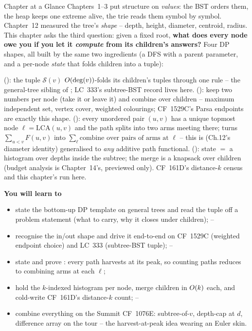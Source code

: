 \begin{chaptertheorybox}{Chapter at a Glance}
Chapters~1--3 put structure on \emph{values}: the BST orders them, the heap
keeps one extreme alive, the trie reads them symbol by symbol. Chapter~12
measured the tree's \emph{shape} -- depth, height, diameter, centroid, radius.
This chapter asks the third question: given a fixed root, \textbf{what does
every node owe you if you let it \emph{compute} from its children's answers?}
Four DP shapes, all built by the same two ingredients (a DFS with a parent
parameter, and a per-node \emph{state} that folds children into a
tuple):

 (): the tuple $\mathcal S(v)$
$O(\deg(v))$-folds its children's tuples through one rule -- the
general-tree sibling of ; LC~333's
subtree-BST record lives here.
 (): keep two numbers per node
(take it or leave it) and combine over children -- maximum independent set,
vertex cover, weighted colourings; CF~1529C's Parsa endpoints are exactly
this shape.
 (): every unordered pair $(u,v)$
has a unique topmost node $\ell = \mathrm{LCA}(u,v)$ and the path splits into
two arms meeting there;  turns $\sum_{u<v} F(u,v)$ into
$\sum_{\ell} \text{combine over pairs of arms at }\ell$ -- this is
 (Ch.12's diameter identity) generalised to \emph{any}
additive path functional.
 (): state $= $ a histogram over
depths inside the subtree; the merge is a knapsack over children (budget
analysis is Chapter~14's, previewed only). CF~161D's distance-$k$ census and
this chapter's  run here.

\textbf{You will learn to}
\begin{itemize}[nosep]
  \item state the bottom-up DP template on general trees and read the tuple
        off a problem statement (what to carry, why it closes under
        children); \hfill{}--
  \item recognise the in/out shape and drive it end-to-end on CF~1529C
        (weighted endpoint choice) and LC~333 (subtree-BST tuple); \hfill{}--
  \item state and prove : every path harvests at its
        peak, so counting paths reduces to combining arms at each $\ell$; \hfill{}
  \item hold the $k$-indexed histogram per node, merge children in
        $O(k)$ each, and cold-write CF~161D's distance-$k$ count; \hfill{}--
  \item combine everything on the Summit CF~1076E: subtree-of-$v$, depth-cap
        at $d$, difference array on the tour -- the harvest-at-peak idea
        wearing an Euler skin. \hfill{}
\end{itemize}


\end{chaptertheorybox}
